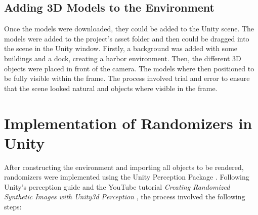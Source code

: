 \subsection{Adding 3D Models to the Environment}
Once the models were downloaded, they could be added to the Unity scene. The models were added to the project's asset folder and then could be dragged into the scene in the Unity window. Firstly, a background was added with some buildings and a dock, creating a harbor environment. Then, the different 3D objects were placed in front of the camera. The models where then positioned to be fully visible within the frame. The process involved trial and error to ensure that the scene looked natural and objects where visible in the frame.


\section{Implementation of Randomizers in Unity}
After constructing the environment and importing all objects to be rendered, randomizers were implemented using the Unity Perception Package \cite{unity-perception2022}. Following Unity's perception guide \cite{unity-perception2022} and the YouTube tutorial \textit{Creating Randomized Synthetic Images with Unity3d Perception} \cite{secrets_of_apagayo_island_video}, the process involved the following steps:


